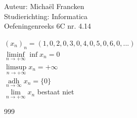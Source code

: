 \documentclass[a4paper]{article}
\begin{document}
\noindent \large Auteur: Michaël Francken \\
\noindent \large Studierichting: Informatica\\
\noindent \large Oefeningenreeks 6C nr. 4.14\\

\medskip

\normalsize


$\left(x_n\right)_n=\left(1,0,2,0,3,0,4,0,5,0,6,0,...\right)$\\

$\liminf\limits_{n\rightarrow+\infty}\inf x_n = 0$\\

$\limsup\limits_{n\rightarrow+\infty} x_n = +\infty$\\

$\operatorname*{adh}\limits_{n \rightarrow \infty} x_n= \{0\}$\\

$\lim\limits_{n\rightarrow+\infty} x_n$ bestaat niet \\

\begin{thebibliography}{999}
\end{thebibliography}
\end{document}

